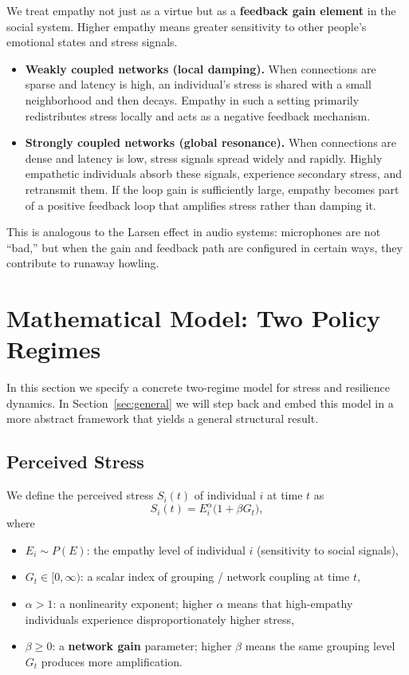 \documentclass[11pt]{article}
\theoremstyle{plain}
\begin{document}
We treat empathy not just as a virtue but as a \textbf{feedback gain element} in the social system.
Higher empathy means greater sensitivity to other people's emotional states and stress signals.

\begin{itemize}
  \item \textbf{Weakly coupled networks (local damping).}  
  When connections are sparse and latency is high, an individual's stress is shared with a small neighborhood and then decays.
  Empathy in such a setting primarily redistributes stress locally and acts as a negative feedback mechanism.

  \item \textbf{Strongly coupled networks (global resonance).}  
  When connections are dense and latency is low, stress signals spread widely and rapidly.
  Highly empathetic individuals absorb these signals, experience secondary stress, and retransmit them.
  If the loop gain is sufficiently large, empathy becomes part of a positive feedback loop that amplifies stress rather than damping it.
\end{itemize}

This is analogous to the Larsen effect in audio systems: microphones are not ``bad,'' but when the gain and feedback path are configured in certain ways, they contribute to runaway howling.

\section{Mathematical Model: Two Policy Regimes}
\label{sec:model}

In this section we specify a concrete two-regime model for stress and resilience dynamics.
In Section~\ref{sec:general} we will step back and embed this model in a more abstract framework that yields a general structural result.

\subsection{Perceived Stress}

We define the perceived stress $S_i(t)$ of individual $i$ at time $t$ as
\begin{equation}
S_i(t) = E_i^{\alpha} \bigl( 1 + \beta G_t \bigr),
\label{eq:stress}
\end{equation}
where
\begin{itemize}
  \item $E_i \sim P(E)$: the empathy level of individual $i$ (sensitivity to social signals),
  \item $G_t \in [0,\infty)$: a scalar index of grouping / network coupling at time $t$,
  \item $\alpha > 1$: a nonlinearity exponent; higher $\alpha$ means that high-empathy individuals experience disproportionately higher stress,
  \item $\beta \ge 0$: a \textbf{network gain} parameter; higher $\beta$ means the same grouping level $G_t$ produces more amplification.
\end{itemize}
\end{document}
